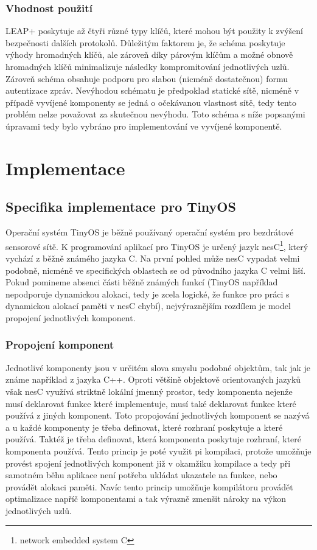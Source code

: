 \documentclass[11pt,final,twoside]{fithesis2}
\begin{document}
\subsection{Vhodnost použití}
LEAP+ poskytuje až čtyři různé typy klíčů, které mohou být použity k zvýšení bezpečnosti dalších protokolů. Důležitým faktorem je, že schéma poskytuje výhody hromadných klíčů, ale zároveň díky 
párovým klíčům a možné obnově hromadných klíčů minimalizuje následky kompromitování jednotlivých uzlů. Zároveň schéma obsahuje podporu pro slabou (nicméně dostatečnou) formu autentizace zpráv. 
Nevýhodou schématu je předpoklad statické sítě, nicméně v případě vyvíjené komponenty se jedná o očekávanou vlastnost sítě, tedy tento problém nelze považovat za skutečnou nevýhodu. Toto 
schéma s níže popsanými úpravami tedy bylo vybráno pro implementování ve vyvíjené komponentě.

\chapter{Implementace}

\section{Specifika implementace pro TinyOS}

Operační systém TinyOS je běžně používaný operační systém pro bezdrátové sensorové sítě. K programování aplikací pro TinyOS je určený jazyk nesC\footnote{network embedded system C}, který vychází z běžně 
známého jazyka C. Na první pohled může nesC vypadat velmi podobně, nicméně ve specifických oblastech se od původního jazyka C velmi liší. Pokud pomineme absenci části běžně známých funkcí (TinyOS například 
nepodporuje dynamickou alokaci, tedy je zcela logické, že funkce pro práci s dynamickou alokací paměti v nesC chybí), nejvýraznějším rozdílem je model propojení jednotlivých komponent.

\subsection{Propojení  komponent}
Jednotlivé komponenty jsou v určitém slova smyslu podobné objektům, tak jak je známe například z jazyka C++. Oproti většině objektově orientovaných jazyků však nesC využívá striktně lokální jmenný prostor, 
tedy komponenta nejenže musí deklarovat funkce které implementuje, musí také deklarovat funkce které používá z jiných komponent. \cite{Levis2009} Toto propojování jednotlivých komponent se nazývá  
a u každé komponenty je třeba definovat, které rozhraní poskytuje a které používá. Taktéž je třeba definovat, která komponenta poskytuje rozhraní, které komponenta používá. Tento princip je poté využit pi 
kompilaci, protože umožňuje provést spojení jednotlivých komponent již v okamžiku kompilace a tedy při samotném běhu aplikace není potřeba ukládat ukazatele na funkce, nebo provádět alokaci paměti. Navíc
tento princip umožňuje kompilátoru provádět optimalizace napříč komponentami a tak výrazně zmenšit nároky na výkon jednotlivých uzlů.
\end{document}
